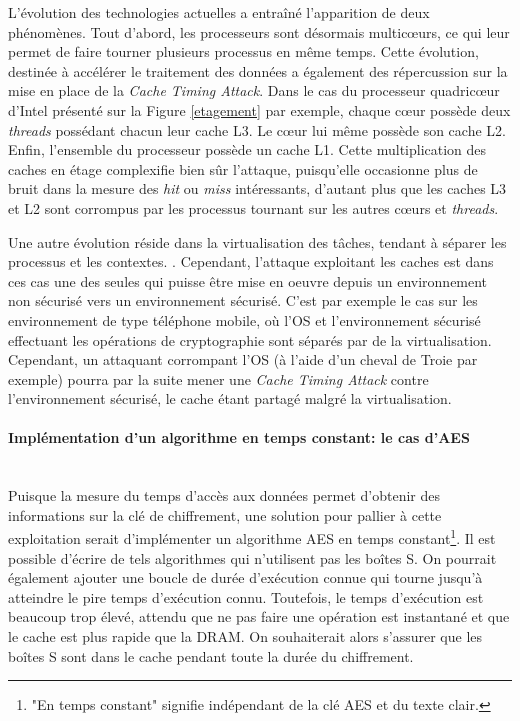 \documentclass[a4paper,11pt]{article}
\begin{document}
L'évolution des technologies actuelles a entraîné l'apparition de deux phénomènes. Tout d'abord, les processeurs sont désormais multicœurs, ce qui leur permet de faire tourner plusieurs processus en même temps. Cette évolution, destinée à accélérer le traitement des données a également des répercussion sur la mise en place de la \emph{Cache Timing Attack}\cite{weiss2012cache}. Dans le cas du processeur quadricœur d'Intel  présenté sur la Figure \ref{etagement} par exemple, chaque cœur possède deux \emph{threads} possédant chacun leur cache L3. Le cœur lui même possède son cache L2. Enfin, l'ensemble du processeur possède un cache L1. Cette multiplication des caches en étage complexifie bien sûr l'attaque, puisqu'elle occasionne plus de bruit dans la mesure des \emph{hit} ou \emph{miss} intéressants, d'autant plus que les caches L3 et L2 sont corrompus par les processus tournant sur les autres cœurs et \emph{threads}.

Une autre évolution réside dans la virtualisation des tâches, tendant à séparer les processus et les contextes. \cite{weiss2012cache}. Cependant, l'attaque exploitant les caches est dans ces cas une des seules qui puisse être mise en oeuvre depuis un environnement non sécurisé vers un environnement sécurisé. C'est par exemple le cas sur les environnement de type téléphone mobile, où l'OS et l'environnement sécurisé effectuant les opérations de cryptographie sont séparés par de la virtualisation. Cependant, un attaquant corrompant l'OS (à l'aide d'un cheval de Troie par exemple) pourra par la suite mener une \emph{Cache Timing Attack} contre l'environnement sécurisé, le cache étant partagé malgré la virtualisation.

\paragraph{Implémentation d'un algorithme en temps constant: le cas d'AES} ~\\
Puisque la mesure du temps d'accès aux données permet d'obtenir des informations sur la clé de chiffrement, une solution pour pallier à cette exploitation serait d'implémenter un algorithme AES en temps constant\footnote{"En temps constant" signifie indépendant de la clé AES et du texte clair.}. Il est possible d'écrire de tels algorithmes qui n'utilisent pas les boîtes S. On pourrait également ajouter une boucle de durée d'exécution connue qui tourne jusqu'à atteindre le pire temps d'exécution connu. Toutefois, le temps d'exécution est beaucoup trop élevé, attendu que ne pas faire une opération est instantané et que le cache est plus rapide que la DRAM.
On souhaiterait alors s'assurer que les boîtes S sont dans le cache pendant toute la durée du chiffrement.
\end{document}
